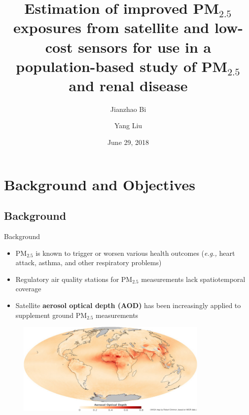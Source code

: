 \documentclass{beamer}
\title[]{\large Estimation of improved PM$_{2.5}$ exposures from satellite and low-cost sensors for use in a population-based study of PM$_{2.5}$ and renal disease}
\author[]{Jianzhao Bi\inst{1} \and \textcolor[rgb]{0.1,0.6,0.1}{Yang Liu}\inst{1}\inst{*}}
\institute[Emory University] %
{
  \inst{1}%
  Environmental Health Sciences\\
  Emory University
 }
\date{June 29, 2018}
\begin{document}
\begin{frame}
  \titlepage
\end{frame}

\section{Background and Objectives}
\subsection{Background}
\begin{frame}{Background}
    \begin{itemize}
        \item PM$_{2.5}$ is known to trigger or worsen various health outcomes (\textit{e.g.,} heart attack, asthma, and other respiratory problems)
        \pause
        \item Regulatory air quality stations for PM$_{2.5}$ measurements lack spatiotemporal coverage
        \pause
        \item Satellite \textbf{aerosol optical depth (AOD)} has been increasingly applied to supplement ground PM$_{2.5}$ measurements
    \end{itemize}
    \vspace{-0.25cm}
    \begin{figure}
        \centering
        \includegraphics[width=0.83\textwidth]{img/satellite_aod.jpg}
        \label{fig:pm25}
    \end{figure}
\end{frame}
\end{document}
